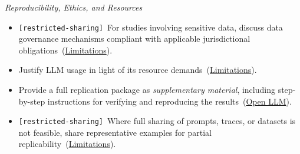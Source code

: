 \documentclass[smallextended]{svjour3}
\makeatletter
\newcommand{\must}{\textbf{must}\xspace}
\newcommand{\should}{\textbf{should}\xspace}
\newcommand{\supplementarymaterial}{\emph{supplementary material}\xspace}
\newcommand{\supplementarymaterial}{\emph{supplementary material}\xspace}
\newcommand{\iconM}{\usebox{\iconMbox}\xspace}
\newcommand{\iconS}{\usebox{\iconSbox}\xspace}
\newcommand{\iconM}{●\xspace}
\newcommand{\iconS}{○\xspace}
\newcommand{\condition}[1]{\texttt{\small[#1]}\,}
\newcommand{\condition}[1]{@@cond:#1@@}
\newcommand{\refopenllm}{\hyperref[sec:use-an-open-llm-as-a-baseline]{Open LLM}}
\newcommand{\reflimitations}{\hyperref[sec:report-limitations-and-mitigations]{Limitations}}
\newcommand{\refopenllm}{\href{/guidelines/use-an-open-llm-as-a-baseline/}{Open LLM}}
\newcommand{\reflimitations}{\href{/guidelines/report-limitations-and-mitigations/}{Limitations}}
\makeatother
\begin{document}
\begin{appendices}
\noindent\textit{Reproducibility, Ethics, and Resources}
\begin{itemize}[label={},leftmargin=*]
    \item \iconM \condition{restricted-sharing} For studies involving sensitive data, discuss data governance mechanisms compliant with applicable jurisdictional obligations~(\reflimitations).
    \item \iconS Justify LLM usage in light of its resource demands~(\reflimitations).
    \item \iconS Provide a full replication package as \supplementarymaterial, including step-by-step instructions for verifying and reproducing the results~(\refopenllm).
    \item \iconS \condition{restricted-sharing} Where full sharing of prompts, traces, or datasets is not feasible, share representative examples for partial replicability~(\reflimitations).
\end{itemize}


\end{appendices}
\end{document}
